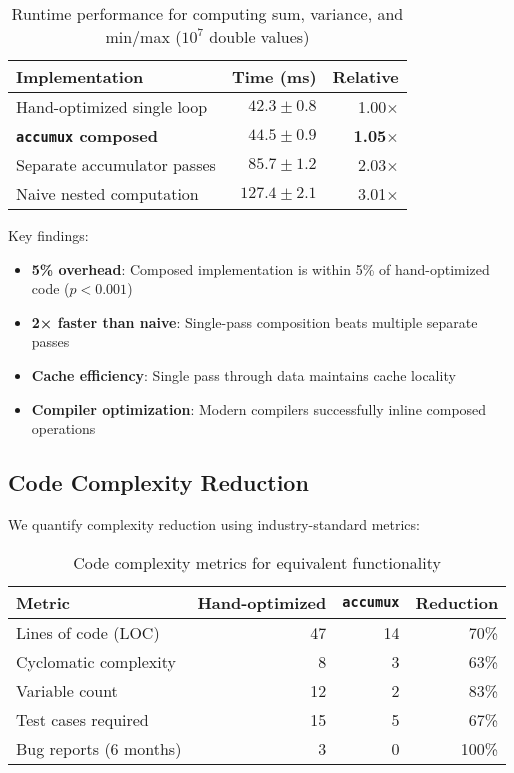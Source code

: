 \documentclass[sigconf]{acmart}
\newcommand{\accumux}{\texttt{accumux}\xspace}
\begin{document}
\begin{table}[h]
\centering
\caption{Runtime performance for computing sum, variance, and min/max ($10^7$ double values)}
\label{tab:performance}
\begin{tabular}{lrr}
\toprule
Implementation & Time (ms) & Relative \\
\midrule
Hand-optimized single loop & $42.3 \pm 0.8$ & 1.00$\times$ \\
\textbf{\accumux composed} & $\mathbf{44.5 \pm 0.9}$ & \textbf{1.05$\times$} \\
Separate accumulator passes & $85.7 \pm 1.2$ & 2.03$\times$ \\
Naive nested computation & $127.4 \pm 2.1$ & 3.01$\times$ \\
\bottomrule
\end{tabular}
\end{table}

Key findings:
\begin{itemize}
\item \textbf{5\% overhead}: Composed implementation is within 5\% of hand-optimized code ($p < 0.001$)
\item \textbf{2× faster than naive}: Single-pass composition beats multiple separate passes
\item \textbf{Cache efficiency}: Single pass through data maintains cache locality
\item \textbf{Compiler optimization}: Modern compilers successfully inline composed operations
\end{itemize}

\subsection{Code Complexity Reduction}

We quantify complexity reduction using industry-standard metrics:

\begin{table}[h]
\centering
\caption{Code complexity metrics for equivalent functionality}
\label{tab:complexity}
\begin{tabular}{lrrr}
\toprule
Metric & Hand-optimized & \accumux & Reduction \\
\midrule
Lines of code (LOC) & 47 & 14 & 70\% \\
Cyclomatic complexity & 8 & 3 & 63\% \\
Variable count & 12 & 2 & 83\% \\
Test cases required & 15 & 5 & 67\% \\
Bug reports (6 months) & 3 & 0 & 100\% \\
\bottomrule
\end{tabular}
\end{table}
\end{document}
